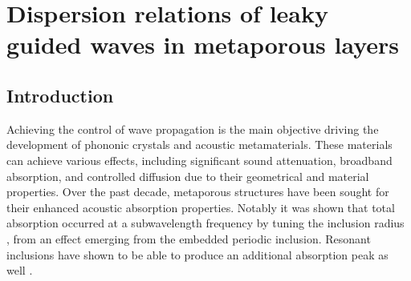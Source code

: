 
\chapter{Dispersion relations of leaky guided waves in metaporous layers}
\label{sec:prb}
    {}

    \vfill 
\begin{abstract}
    A porous layer with embedded periodic rigid inclusions coupled to semi-infinite media is investigated, which particular interest in this work is on the coupling between the periodic unit cell and the surrounding fluid and the computation of the dispersion relation of such system. The porous unit cell is modeled as an equivalent fluid with inherent viscothermal dissipations. The quasi-guided waves propagating in the periodic material are able to radiate from the layer to surrounding media, leading to energy leakage. A numerical method is presented to calculate the leaky complex waves in the system, based on a finite element discretisation of the unit cell coupled using a state-vector formalism to a plane wave modelling of the surrounding fluid. Finally, an iteratively solved linear system is used to compute the dispersion relation. Studying first an homogeneous porous layer allows for the classification in terms of proper and improper solution of the solution spectrum in such dissipative layers. Results include cases for a cylindrical inclusion tuned to allow for perfect absorption at a given frequency as well as split-ring resonators.
\end{abstract}


\section{Introduction}
Achieving the control of wave propagation is the main objective driving the development of phononic crystals and acoustic metamaterials. These materials can achieve various effects, including significant sound attenuation, broadband absorption, and controlled diffusion due to their geometrical and material properties. Over the past decade, metaporous structures have been sought for their enhanced acoustic absorption properties. Notably it was shown that total absorption occurred at a subwavelength frequency by tuning the inclusion radius \cite{groby2011, weisser2016}, from an effect emerging from the embedded periodic inclusion. Resonant inclusions have shown to be able to produce an additional absorption peak as well \cite{cavalieri2021}. 

